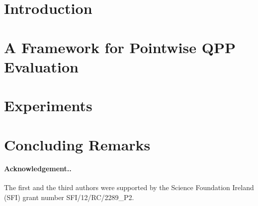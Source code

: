 \documentclass[]{ceurart}
\newcommand{\para}[1]{\paragraph{\textnormal{\textbf{#1}.}}}
\begin{document}
\section{Introduction}


\section{A Framework for Pointwise QPP Evaluation}


\section{Experiments}


\section{Concluding Remarks}


\para{\textbf{Acknowledgement.}} \small The first and the third authors were supported by the Science Foundation Ireland (SFI) grant number SFI/12/RC/2289\_P2.


\end{document}
